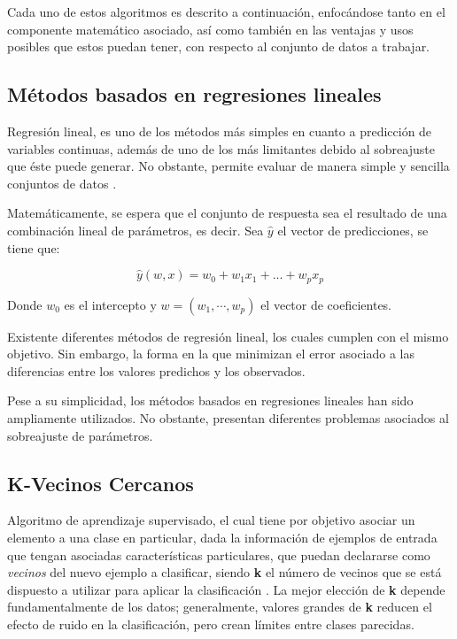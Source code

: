 Cada uno de estos algoritmos es descrito a continuación, enfocándose tanto en el componente matemático asociado, así como también en las ventajas y usos posibles que estos puedan tener, con respecto al conjunto de datos a trabajar.

\subsection{Métodos basados en regresiones lineales}

Regresión lineal, es uno de los métodos más simples en cuanto a predicción de variables continuas, además de uno de los más limitantes debido al sobreajuste que éste puede generar. No obstante, permite evaluar de manera simple y sencilla conjuntos de datos \cite{graybill1976theory}. 

Matemáticamente, se espera que el conjunto de respuesta sea el resultado de una combinación lineal de parámetros, es decir. Sea $\hat{y}$ el vector de predicciones, se tiene que:

\begin{equation}
	\hat{y}(w, x) = w_0 + w_1 x_1 + ... + w_p x_p
\end{equation}

Donde $w_0$ es el intercepto y $w = (w_1,\cdots, w_p)$ el vector de coeficientes.

Existente diferentes métodos de regresión lineal, los cuales cumplen con el mismo objetivo. Sin embargo, la forma en la que minimizan el error asociado a las diferencias entre los valores predichos y los observados.

Pese a su simplicidad, los métodos basados en regresiones lineales han sido ampliamente utilizados. No obstante, presentan diferentes problemas asociados al sobreajuste de parámetros.
 
\subsection{K-Vecinos Cercanos}

Algoritmo de aprendizaje supervisado, el cual tiene por objetivo asociar un elemento a una clase en particular, dada la información de ejemplos de entrada que tengan asociadas características particulares, que puedan declararse como \textit{vecinos} del nuevo ejemplo a clasificar, siendo \textbf{k} el número de vecinos que se está dispuesto a utilizar para aplicar la clasificación \cite{6313426}. La mejor elección de \textbf{k} depende fundamentalmente de los datos; generalmente, valores grandes de \textbf{k} reducen el efecto de ruido en la clasificación, pero crean límites entre clases parecidas.


